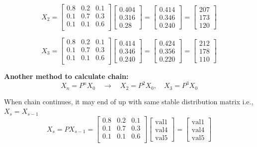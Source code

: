 \documentclass[letterpaper, 10.5pt,landscape]{article}
\begin{document}
\begin{multicols*}{3}
\vspace{-5pt}
\[ X_{2} = 
\begin{bmatrix}
  0.8 & 0.2 & 0.1 \\
  0.1 & 0.7 & 0.3 \\
  0.1 & 0.1 & 0.6 \\
\end{bmatrix}
\begin{bmatrix}
0.404 \\
0.316 \\
0.28
\end{bmatrix}
=
\begin{bmatrix}
0.414 \\
0.346 \\
0.240
\end{bmatrix} 
= 
\begin{bmatrix}
207 \\
173 \\
120
\end{bmatrix}
\]


\vspace{-3pt}
\[ X_{3} = 
\begin{bmatrix}
  0.8 & 0.2 & 0.1 \\
  0.1 & 0.7 & 0.3 \\
  0.1 & 0.1 & 0.6 \\
\end{bmatrix}
\begin{bmatrix}
0.414 \\
0.346 \\
0.240
\end{bmatrix} 
=
\begin{bmatrix}
0.424 \\
0.356 \\
0.220
\end{bmatrix} 
= 
\begin{bmatrix}
212 \\
178 \\
110
\end{bmatrix}
\]


\textbf{Another method to calculate chain:}
\vspace{-3pt}
\[X_{n} = P^{n}X_{0} \quad \rightarrow \quad X_{2} = P^{2}X_{0}, \quad X_{3} = P^{3}X_{0} \]

When chain continues, it may end of up with same stable distribution matrix i.e., $X_{s} = X_{s-1}$
\vspace{-3pt}
\[ X_{s} = PX_{s-1} = 
\begin{bmatrix}
  0.8 & 0.2 & 0.1 \\
  0.1 & 0.7 & 0.3 \\
  0.1 & 0.1 & 0.6 \\
\end{bmatrix}
\begin{bmatrix}
  \text{val}1 \\
  \text{val}4 \\
  \text{val}5
\end{bmatrix} =
\begin{bmatrix}
  \text{val}1 \\
  \text{val}4 \\
  \text{val}5
\end{bmatrix}
\] 





\end{multicols*}
\end{document}
